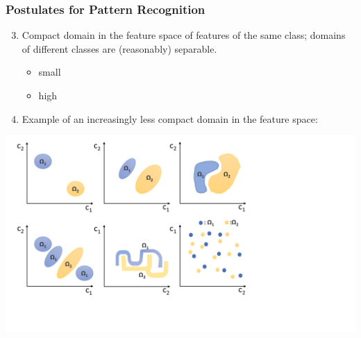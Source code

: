 \begin{frame}
   \frametitle{Postulates for Pattern Recognition \cont}

   \begin{enumerate}
      \setcounter{enumi}{2}
      \item Compact domain in the feature space of features of the same class; domains of different classes are (reasonably) separable.
        \begin{itemize}
           \item small 
           \item high  \\[.5cm]
        \end{itemize}
      \item[] Example of an increasingly less compact domain in the feature space:
   \end{enumerate}

   \begin{center}
      \includegraphics[width=.70\linewidth, trim={0  3cm 7cm 0cm},clip]{images/featurespace.pdf}
   \end{center}
\end{frame}


